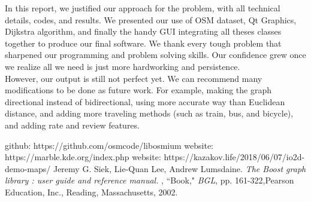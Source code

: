 \documentclass[a4paper, 12pt, english]{book}
\begin{document}
In this report, we justified our approach for the problem, with all technical details, codes, and results. We presented our use of OSM dataset, Qt Graphics, Dijkstra algorithm, and finally the handy GUI integrating all theses classes together to produce our final software. We thank every tough problem that sharpened our programming and problem solving skills. Our confidence grew once we realize all we need is just more hardworking and persistence.\\

However, our output is still not perfect yet. We can recommend many modifications
to be done as future work. For example, making the graph directional instead of bidirectional, using more accurate way than Euclidean distance, and adding more traveling methods (such as train, bus, and bicycle), and adding rate and review features.


\begin{thebibliography}{12}
github: https://github.com/osmcode/libosmium
website: https://marble.kde.org/index.php
website: https://kazakov.life/2018/06/07/io2d-demo-maps/
Jeremy G. Siek,
Lie-Quan Lee, Andrew Lumsdaine.
\textit{The Boost graph library : user guide and reference manual.} , ``Book," \emph{BGL}, pp. 161-322,Pearson Education, Inc., Reading, Massachusetts, 2002.
\end{thebibliography}
\end{document}
